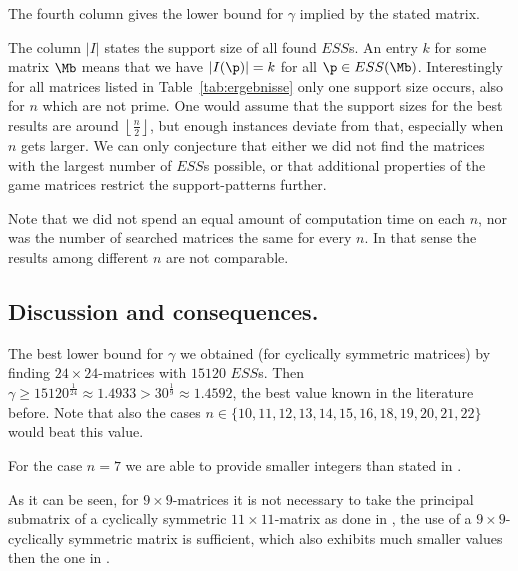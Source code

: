 \documentclass[moor]{informs3}              %
\begin{document}
The fourth column gives the lower bound for $\gamma$ implied by the stated matrix.

The column $|I|$ states the support size of all found $ESS$s. An entry $k$ for some matrix $\Mb$ means that we have $|I(\p)|=k$ for all $\p\in ESS(\Mb)$. Interestingly for all matrices listed in Table~\ref{tab:ergebnisse} only one support size occurs, also for $n$ which are not prime. One would assume that the support sizes for the best results are around $\left \lfloor \frac{n}{2} \right \rfloor$, but enough instances deviate from that, especially when $n$ gets larger. We can only conjecture that either we did not find the matrices with the largest number of $ESS$s possible, or that additional properties of the game matrices restrict the support-patterns further.

Note that we did not spend an equal amount of computation time on each $n$, nor was the number of searched matrices the same for every $n$. In that sense the results among different $n$ are not comparable.


\subsection{Discussion and consequences.}\label{secdisc}

The best lower bound for $\gamma$ we obtained (for cyclically symmetric matrices) by finding  $24\times 24$-matrices with $15120$ $ESS$s.
Then $\gamma \geq 15120^\frac 1 {24} \approx 1.4933 > 30^\frac 1 9 \approx 1.4592$, the best value known in the literature before. Note that also the cases $n\in \{10, 11, 12, 13, 14, 15, 16, 18, 19, 20, 21, 22\}$ would beat this value.

For the case $n=7$ we are able to provide smaller integers than stated in \cite{Vick88b}.

As it can be seen, for $9\times 9$-matrices it is not necessary to take the principal submatrix of a cyclically symmetric $11\times 11$-matrix as done in \cite{Broo93a}, the use of a $9 \times 9$-cyclically symmetric matrix is sufficient, which also exhibits much smaller values then the one in \cite{Broo93a}.
\end{document}
